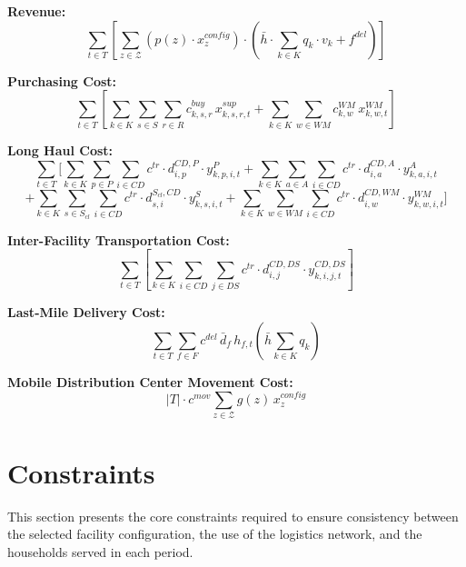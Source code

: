 \documentclass[12pt]{article}
\begin{document}
\vspace{0.3cm}

\textbf{Revenue:}
\[
\sum_{t \in T} 
\left[
    \sum_{z \in \mathcal{Z}} 
    \left(
        p(z) \cdot x^{config}_z
    \right) \cdot 
    \left(
        \bar{h} \cdot \sum_{k \in K} q_k \cdot v_k
        + f^{del}
    \right)
\right]
\]

\vspace{0.3cm}

\textbf{Purchasing Cost:}
\[
\sum_{t \in T}
\left[
    \sum_{k \in K} \sum_{s \in S} \sum_{r \in R} c^{buy}_{k,s,r} \, x^{sup}_{k,s,r,t}
    +
    \sum_{k \in K} \sum_{w \in WM} c^{WM}_{k,w} \, x^{WM}_{k,w,t}
\right]
\]

\vspace{0.3cm}

\textbf{Long Haul Cost:}
\[
\sum_{t \in T}
\Bigg[
    \sum_{k \in K} \sum_{p \in P} \sum_{i \in CD} 
    c^{tr} \cdot d^{CD,P}_{i,p} \cdot y^{P}_{k,p,i,t}
    +
    \sum_{k \in K} \sum_{a \in A} \sum_{i \in CD} 
    c^{tr} \cdot d^{CD,A}_{i,a} \cdot y^{A}_{k,a,i,t}
\]
\[
    +
    \sum_{k \in K} \sum_{s \in S_{cl}} \sum_{i \in CD} 
    c^{tr} \cdot d^{S_{cl},CD}_{s,i} \cdot y^{S}_{k,s,i,t}
    +
    \sum_{k \in K} \sum_{w \in WM} \sum_{i \in CD} 
    c^{tr} \cdot d^{CD,WM}_{i,w} \cdot y^{WM}_{k,w,i,t}
\Bigg]
\]

\vspace{0.3cm}

\textbf{Inter-Facility Transportation Cost:}
\[
\sum_{t \in T}
\left[
    \sum_{k \in K} \sum_{i \in CD} \sum_{j \in DS}
    c^{tr} \cdot d^{CD,DS}_{i,j} \cdot y^{CD,DS}_{k,i,j,t}
\right]
\]

\vspace{0.3cm}

\textbf{Last-Mile Delivery Cost:}
\[
\sum_{t \in T} \sum_{f \in F}
c^{del}\,\bar{d}_f\,h_{f,t}
\left(\bar{h}\sum_{k \in K} q_k\right)
\]

\vspace{0.3cm}

\textbf{Mobile Distribution Center Movement Cost:}
\[
|T| \cdot c^{mov}
\sum_{z \in \mathcal{Z}} g(z)\, x^{config}_z
\]

\newpage
\section{Constraints}

This section presents the core constraints required to ensure consistency between the selected facility configuration, the use of the logistics network, and the households served in each period.
\end{document}
